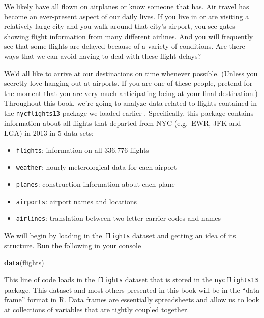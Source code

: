 \documentclass[]{tufte-book}
\newenvironment{Shaded}{\begin{snugshade}}{\end{snugshade}}
\newcommand{\KeywordTok}[1]{\textcolor[rgb]{0.13,0.29,0.53}{\textbf{{#1}}}}
\newcommand{\NormalTok}[1]{{#1}}
\providecommand{\tightlist}{%
  \setlength{\itemsep}{0pt}\setlength{\parskip}{0pt}}
\begin{document}
We likely have all flown on airplanes or know someone that has. Air
travel has become an ever-present aspect of our daily lives. If you live
in or are visiting a relatively large city and you walk around that
city's airport, you see gates showing flight information from many
different airlines. And you will frequently see that some flights are
delayed because of a variety of conditions. Are there ways that we can
avoid having to deal with these flight delays?

We'd all like to arrive at our destinations on time whenever possible.
(Unless you secretly love hanging out at airports. If you are one of
these people, pretend for the moment that you are very much anticipating
being at your final destination.) Throughout this book, we're going to
analyze data related to flights contained in the \texttt{nycflights13}
package we loaded earlier \citep{R-nycflights13}. Specifically, this
package contains information about all flights that departed from NYC
(e.g.~EWR, JFK and LGA) in 2013 in 5 data sets:

\begin{itemize}
\tightlist
\item
  \texttt{flights}: information on all 336,776 flights
\item
  \texttt{weather}: hourly meterological data for each airport
\item
  \texttt{planes}: construction information about each plane
\item
  \texttt{airports}: airport names and locations
\item
  \texttt{airlines}: translation between two letter carrier codes and
  names
\end{itemize}

We will begin by loading in the \texttt{flights} dataset and getting an
idea of its structure. Run the following in your console

\begin{Shaded}
\begin{Highlighting}[]
\KeywordTok{data}\NormalTok{(flights)}
\end{Highlighting}
\end{Shaded}

This line of code loads in the \texttt{flights} dataset that is stored
in the \texttt{nycflights13} package. This dataset and most others
presented in this book will be in the ``data frame'' format in R. Data
frames are essentially spreadsheets and allow us to look at collections
of variables that are tightly coupled together.
\end{document}
